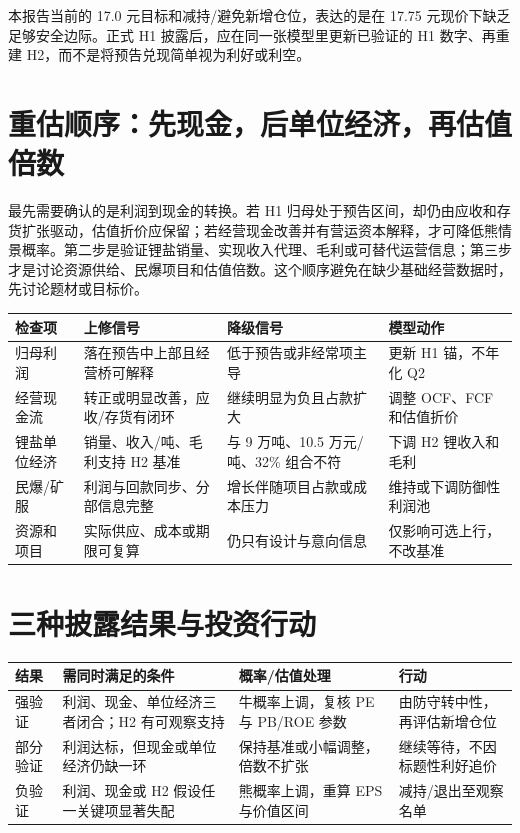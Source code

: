 \begin{houseviewbox}
本报告当前的 17.0 元目标和减持/避免新增仓位，表达的是在 17.75 元现价下缺乏足够安全边际。正式 H1 披露后，应在同一张模型里更新已验证的 H1 数字、再重建 H2，而不是将预告兑现简单视为利好或利空。
\end{houseviewbox}

\section{重估顺序：先现金，后单位经济，再估值倍数}

最先需要确认的是利润到现金的转换。若 H1 归母处于预告区间，却仍由应收和存货扩张驱动，估值折价应保留；若经营现金改善并有营运资本解释，才可降低熊情景概率。第二步是验证锂盐销量、实现收入代理、毛利或可替代运营信息；第三步才是讨论资源供给、民爆项目和估值倍数。这个顺序避免在缺少基础经营数据时，先讨论题材或目标价。

\begin{exhibitbox}[表 13-1：正式 H1 的重估决策树]
\begin{tabularx}{\exhibitboxwidth}{L{2.8cm}X X X}
\toprule
检查项 & 上修信号 & 降级信号 & 模型动作 \\
\midrule
归母利润 & 落在预告中上部且经营桥可解释 & 低于预告或非经常项主导 & 更新 H1 锚，不年化 Q2 \\
经营现金流 & 转正或明显改善，应收/存货有闭环 & 继续明显为负且占款扩大 & 调整 OCF、FCF 和估值折价 \\
锂盐单位经济 & 销量、收入/吨、毛利支持 H2 基准 & 与 9 万吨、10.5 万元/吨、32\% 组合不符 & 下调 H2 锂收入和毛利 \\
民爆/矿服 & 利润与回款同步、分部信息完整 & 增长伴随项目占款或成本压力 & 维持或下调防御性利润池 \\
资源和项目 & 实际供应、成本或期限可复算 & 仍只有设计与意向信息 & 仅影响可选上行，不改基准 \\
\bottomrule
\end{tabularx}
\end{exhibitbox}

\section{三种披露结果与投资行动}

\begin{exhibitbox}
\begin{tabularx}{\exhibitboxwidth}{L{2.2cm}X X X}
\toprule
结果 & 需同时满足的条件 & 概率/估值处理 & 行动 \\
\midrule
强验证 & 利润、现金、单位经济三者闭合；H2 有可观察支持 & 牛概率上调，复核 PE 与 PB/ROE 参数 & 由防守转中性，再评估新增仓位 \\
部分验证 & 利润达标，但现金或单位经济仍缺一环 & 保持基准或小幅调整，倍数不扩张 & 继续等待，不因标题性利好追价 \\
负验证 & 利润、现金或 H2 假设任一关键项显著失配 & 熊概率上调，重算 EPS 与价值区间 & 减持/退出至观察名单 \\
\bottomrule
\end{tabularx}
\end{exhibitbox}

